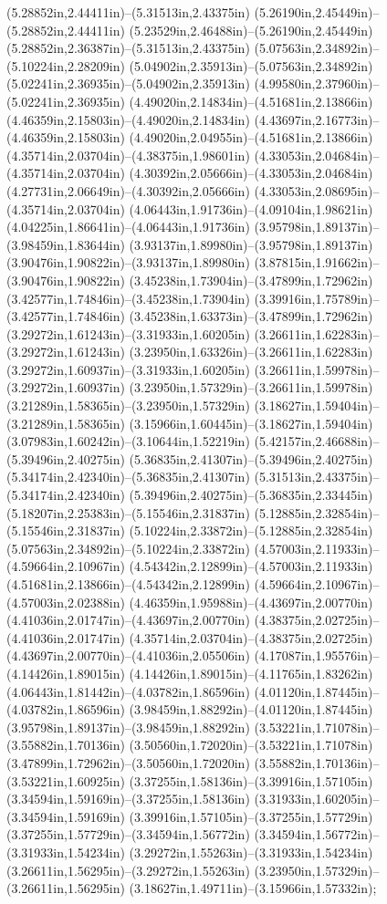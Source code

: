 (5.28852in,2.44411in)--(5.31513in,2.43375in) (5.26190in,2.45449in)--(5.28852in,2.44411in) (5.23529in,2.46488in)--(5.26190in,2.45449in) (5.28852in,2.36387in)--(5.31513in,2.43375in) (5.07563in,2.34892in)--(5.10224in,2.28209in) (5.04902in,2.35913in)--(5.07563in,2.34892in) (5.02241in,2.36935in)--(5.04902in,2.35913in) (4.99580in,2.37960in)--(5.02241in,2.36935in) (4.49020in,2.14834in)--(4.51681in,2.13866in) (4.46359in,2.15803in)--(4.49020in,2.14834in) (4.43697in,2.16773in)--(4.46359in,2.15803in) (4.49020in,2.04955in)--(4.51681in,2.13866in) (4.35714in,2.03704in)--(4.38375in,1.98601in) (4.33053in,2.04684in)--(4.35714in,2.03704in) (4.30392in,2.05666in)--(4.33053in,2.04684in) (4.27731in,2.06649in)--(4.30392in,2.05666in) (4.33053in,2.08695in)--(4.35714in,2.03704in) (4.06443in,1.91736in)--(4.09104in,1.98621in) (4.04225in,1.86641in)--(4.06443in,1.91736in) (3.95798in,1.89137in)--(3.98459in,1.83644in) (3.93137in,1.89980in)--(3.95798in,1.89137in) (3.90476in,1.90822in)--(3.93137in,1.89980in) (3.87815in,1.91662in)--(3.90476in,1.90822in) (3.45238in,1.73904in)--(3.47899in,1.72962in) (3.42577in,1.74846in)--(3.45238in,1.73904in) (3.39916in,1.75789in)--(3.42577in,1.74846in) (3.45238in,1.63373in)--(3.47899in,1.72962in) (3.29272in,1.61243in)--(3.31933in,1.60205in) (3.26611in,1.62283in)--(3.29272in,1.61243in) (3.23950in,1.63326in)--(3.26611in,1.62283in) (3.29272in,1.60937in)--(3.31933in,1.60205in) (3.26611in,1.59978in)--(3.29272in,1.60937in) (3.23950in,1.57329in)--(3.26611in,1.59978in) (3.21289in,1.58365in)--(3.23950in,1.57329in) (3.18627in,1.59404in)--(3.21289in,1.58365in) (3.15966in,1.60445in)--(3.18627in,1.59404in) (3.07983in,1.60242in)--(3.10644in,1.52219in) (5.42157in,2.46688in)--(5.39496in,2.40275in) (5.36835in,2.41307in)--(5.39496in,2.40275in) (5.34174in,2.42340in)--(5.36835in,2.41307in) (5.31513in,2.43375in)--(5.34174in,2.42340in) (5.39496in,2.40275in)--(5.36835in,2.33445in) (5.18207in,2.25383in)--(5.15546in,2.31837in) (5.12885in,2.32854in)--(5.15546in,2.31837in) (5.10224in,2.33872in)--(5.12885in,2.32854in) (5.07563in,2.34892in)--(5.10224in,2.33872in) (4.57003in,2.11933in)--(4.59664in,2.10967in) (4.54342in,2.12899in)--(4.57003in,2.11933in) (4.51681in,2.13866in)--(4.54342in,2.12899in) (4.59664in,2.10967in)--(4.57003in,2.02388in) (4.46359in,1.95988in)--(4.43697in,2.00770in) (4.41036in,2.01747in)--(4.43697in,2.00770in) (4.38375in,2.02725in)--(4.41036in,2.01747in) (4.35714in,2.03704in)--(4.38375in,2.02725in) (4.43697in,2.00770in)--(4.41036in,2.05506in) (4.17087in,1.95576in)--(4.14426in,1.89015in) (4.14426in,1.89015in)--(4.11765in,1.83262in) (4.06443in,1.81442in)--(4.03782in,1.86596in) (4.01120in,1.87445in)--(4.03782in,1.86596in) (3.98459in,1.88292in)--(4.01120in,1.87445in) (3.95798in,1.89137in)--(3.98459in,1.88292in) (3.53221in,1.71078in)--(3.55882in,1.70136in) (3.50560in,1.72020in)--(3.53221in,1.71078in) (3.47899in,1.72962in)--(3.50560in,1.72020in) (3.55882in,1.70136in)--(3.53221in,1.60925in) (3.37255in,1.58136in)--(3.39916in,1.57105in) (3.34594in,1.59169in)--(3.37255in,1.58136in) (3.31933in,1.60205in)--(3.34594in,1.59169in) (3.39916in,1.57105in)--(3.37255in,1.57729in) (3.37255in,1.57729in)--(3.34594in,1.56772in) (3.34594in,1.56772in)--(3.31933in,1.54234in) (3.29272in,1.55263in)--(3.31933in,1.54234in) (3.26611in,1.56295in)--(3.29272in,1.55263in) (3.23950in,1.57329in)--(3.26611in,1.56295in) (3.18627in,1.49711in)--(3.15966in,1.57332in);
